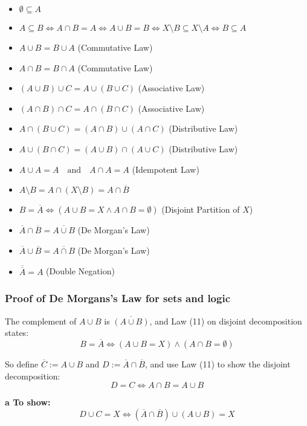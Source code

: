 \begin{itemize}[label=\(-\)]
	\item \(\emptyset \subseteq A\)
	\item \(A \subseteq B \iff A \cap B = A \iff A \cup B = B \iff X \setminus B \subseteq X \setminus A \iff B \subseteq A\)
	\item \(A \cup B = B \cup A\) \hfill (Commutative Law)
	\item \(A \cap B = B \cap A\) \hfill (Commutative Law)
	\item \((A \cup B) \cup C = A \cup (B \cup C)\) \hfill (Associative Law)
	\item \((A \cap B) \cap C = A \cap (B \cap C)\) \hfill (Associative Law)
	\item \(A \cap (B \cup C) = (A \cap B) \cup (A \cap C)\) \hfill (Distributive Law)
	\item \(A \cup (B \cap C) = (A \cup B) \cap (A \cup C)\) \hfill (Distributive Law)
	\item \(A \cup A = A \quad \text{and} \quad A \cap A = A\) \hfill (Idempotent Law)
	\item \(A \setminus B = A \cap (X \setminus B) = A \cap \overline{B}\)
	\item \(B = \overline{A} \iff (A \cup B = X \land A \cap B = \emptyset)\) \hfill (Disjoint Partition of \(X\))
	\item \(\overline{A} \cap \overline{B} = \overline{A \cup B}\) \hfill (De Morgan's Law)
	\item \(\overline{A} \cup \overline{B} = \overline{A \cap B}\) \hfill (De Morgan's Law)
	\item \(\overline{\overline{A}} = A\) \hfill (Double Negation)
\end{itemize}

\subsubsection{Proof of De Morgans's Law for sets and logic}
The complement of \( A \cup B \) is \( \overline{(A \cup B)} \), and Law (11) on disjoint decomposition states:
\[
	B = \overline{A} \iff (A \cup B = X) \land (A \cap B = \emptyset)
\]

So define \( \overline{C} := A \cup B \) and \( D := \overline{A} \cap \overline{B} \),
and use Law (11) to show the disjoint decomposition:
\[
	D = C \iff A \cap B = A \cup B
\]

\textbf{a To show:}
\[
	D \cup C = X \iff (\overline{A} \cap \overline{B}) \cup (A \cup B) = X
\]

